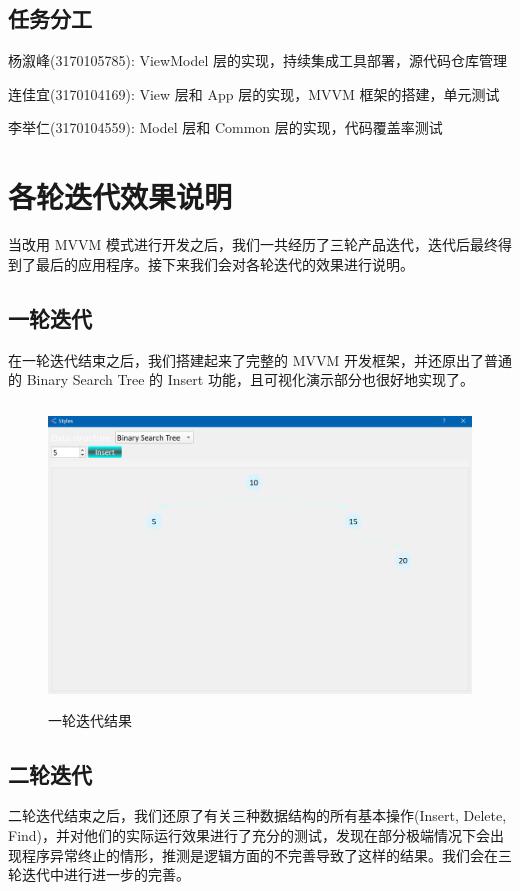 \documentclass{article}%
\begin{document}
\subsection{任务分工}
	\par 杨溆峰(3170105785): ViewModel 层的实现，持续集成工具部署，源代码仓库管理
	\par 连佳宜(3170104169): View 层和 App 层的实现，MVVM 框架的搭建，单元测试
	\par 李举仁(3170104559): Model 层和 Common 层的实现，代码覆盖率测试
\section{各轮迭代效果说明}
	\par 当改用 MVVM 模式进行开发之后，我们一共经历了三轮产品迭代，迭代后最终得到了最后的应用程序。接下来我们会对各轮迭代的效果进行说明。
\subsection{一轮迭代}
	\par 在一轮迭代结束之后，我们搭建起来了完整的 MVVM 开发框架，并还原出了普通的 Binary Search Tree 的 Insert 功能，且可视化演示部分也很好地实现了。
	
\begin{figure}[htbp]
	\centering
	\includegraphics[height=8.0cm,width=12.0cm]{./image/8.png}
	\caption{一轮迭代结果}
\end{figure}	

\subsection{二轮迭代}
	\par 二轮迭代结束之后，我们还原了有关三种数据结构的所有基本操作(Insert, Delete, Find)，并对他们的实际运行效果进行了充分的测试，发现在部分极端情况下会出现程序异常终止的情形，推测是逻辑方面的不完善导致了这样的结果。我们会在三轮迭代中进行进一步的完善。
	
\end{document}
